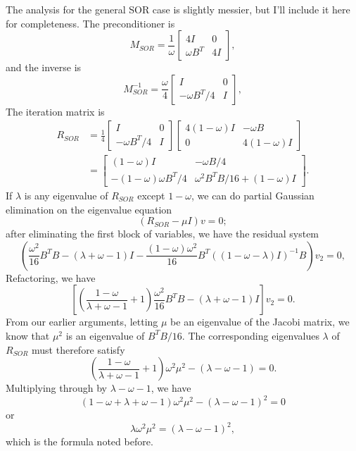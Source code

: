 The analysis for the general SOR case is slightly messier, but I'll
include it here for completeness.  The preconditioner is
\[
  M_{SOR} = \frac{1}{\omega}
  \begin{bmatrix} 4I & 0 \\ \omega B^T & 4I \end{bmatrix},
\]
and the inverse is
\[
  M_{SOR}^{-1} =
  \frac{\omega}{4} \begin{bmatrix} I & 0 \\ -\omega B^T/4 & I \end{bmatrix},
\]
The iteration matrix is
\begin{align*}
  R_{SOR} &=
  \frac{1}{4} \begin{bmatrix} I & 0 \\ -\omega B^T/4 & I \end{bmatrix}
  \begin{bmatrix} 4(1-\omega) I & -\omega B \\ 0 & 4(1-\omega) I \end{bmatrix} \\
  &=
  \begin{bmatrix}
    (1-\omega) I & -\omega B/4 \\
    -(1-\omega) \omega B^T/4 & \omega^2 B^T B/16 + (1-\omega) I
  \end{bmatrix}.
\end{align*}
If $\lambda$ is any eigenvalue of $R_{SOR}$ except $1-\omega$, we can do
partial Gaussian elimination on the eigenvalue equation
\[
  (R_{SOR}-\mu I) v = 0;
\]
after eliminating the first block of variables, we have the residual system
\[
  \left(\frac{\omega^2}{16} B^T B-(\lambda+\omega-1) I - \frac{(1-\omega)\omega^2}{16} B^T ((1-\omega-\lambda) I)^{-1} B\right)
v_2 = 0,
\]
Refactoring, we have
\[
  \left[
\left( \frac{1-\omega}{\lambda+\omega-1} + 1 \right)
  \frac{\omega^2}{16} B^T B - (\lambda+\omega-1) I \right] v_2 = 0.
\]
From our earlier arguments, letting $\mu$ be an eigenvalue of the
Jacobi matrix, we know that $\mu^2$ is an eigenvalue of $B^T B/16$.  The
corresponding eigenvalues $\lambda$ of $R_{SOR}$ must therefore
satisfy
\[
  \left( \frac{1-\omega}{\lambda+\omega-1} + 1 \right) \omega^2 \mu^2 - (\lambda-\omega-1) = 0.
\]
Multiplying through by $\lambda-\omega-1$, we have
\[
  (1-\omega + \lambda + \omega - 1) \omega^2 \mu^2 -
  (\lambda-\omega-1)^2 = 0
\]
or
\[
 \lambda \omega^2 \mu^2 = (\lambda - \omega - 1)^2,
\]
which is the formula noted before.
